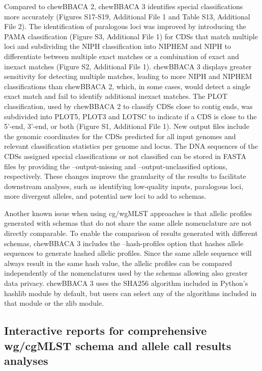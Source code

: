 Compared to chewBBACA 2, chewBBACA 3 identifies special classifications more accurately (Figures S17-S19, Additional File 1 and Table S13, Additional File 2). The identification of paralogous loci was improved by introducing the PAMA classification (Figure S3, Additional File 1) for CDSs that match multiple loci and subdividing the NIPH classification into NIPHEM and NIPH to differentiate between multiple exact matches or a combination of exact and inexact matches (Figure S2, Additional File 1). chewBBACA 3 displays greater sensitivity for detecting multiple matches, leading to more NIPH and NIPHEM classifications than chewBBACA 2, which, in some cases, would detect a single exact match and fail to identify additional inexact matches. The PLOT classification, used by chewBBACA 2 to classify CDSs close to contig ends, was subdivided into PLOT5, PLOT3 and LOTSC to indicate if a CDS is close to the 5'-end, 3'-end, or both (Figure S1, Additional File 1). New output files include the genomic coordinates for the CDSs predicted for all input genomes and relevant classification statistics per genome and locus. The DNA sequences of the CDSs assigned special classifications or not classified can be stored in FASTA files by providing the --output-missing and --output-unclassified options, respectively. These changes improve the granularity of the results to facilitate downstream analyses, such as identifying low-quality inputs, paralogous loci, more divergent alleles, and potential new loci to add to schemas.

Another known issue when using cg/wgMLST approaches is that allelic profiles generated with schemas that do not share the same allele nomenclature are not directly comparable. To enable the comparison of results generated with different schemas, chewBBACA 3 includes the --hash-profiles option that hashes allele sequences to generate hashed allelic profiles. Since the same allele sequence will always result in the same hash value, the allelic profiles can be compared independently of the nomenclatures used by the schemas allowing also greater data privacy. chewBBACA 3 uses the SHA256 algorithm included in Python’s hashlib module by default, but users can select any of the algorithms included in that module or the zlib module.

\subsection{Interactive reports for comprehensive wg/cgMLST schema and allele call results analyses} \label{ssec:results_discussion_ssec4}

